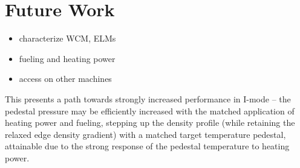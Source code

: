 \section{Future Work}\label{sec:conc_future}

\begin{itemize}
 \item characterize WCM, ELMs
 \item fueling and heating power
 \item access on other machines
\end{itemize}

This presents a path towards strongly increased performance in I-mode -- the pedestal pressure may be efficiently increased with the matched application of heating power and fueling, stepping up the density profile (while retaining the relaxed edge density gradient) with a matched target temperature pedestal, attainable due to the strong response of the pedestal temperature to heating power.  

\nicechapterending


